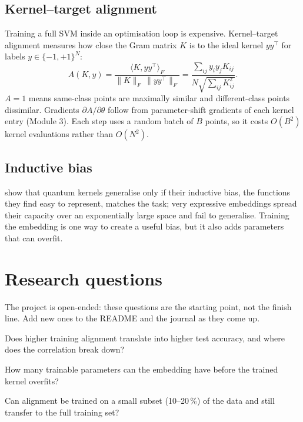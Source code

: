 \documentclass[11pt,a4paper]{article}
\begin{document}
\subsection{Kernel--target alignment}
Training a full SVM inside an optimisation loop is expensive. Kernel--target alignment
\citep{cristianini2001} measures how close the Gram matrix $K$ is to the ideal kernel $yy^\top$ for
labels $y\in\{-1,+1\}^N$:
\begin{equation}
  A(K,y)=\frac{\langle K,yy^\top\rangle_F}{\lVert K\rVert_F\,\lVert yy^\top\rVert_F}
        =\frac{\sum_{ij}y_iy_jK_{ij}}{N\sqrt{\sum_{ij}K_{ij}^2}} .
\end{equation}
$A=1$ means same-class points are maximally similar and different-class points dissimilar.
Gradients $\partial A/\partial\theta$ follow from parameter-shift gradients of each kernel entry
(Module 3). Each step uses a random batch of $B$ points, so it costs $O(B^2)$ kernel evaluations
rather than $O(N^2)$.

\subsection{Inductive bias}
\citet{kubler2021} show that quantum kernels generalise only if their inductive bias, the functions
they find easy to represent, matches the task; very expressive embeddings spread their capacity
over an exponentially large space and fail to generalise. Training the embedding is one way to
create a useful bias, but it also adds parameters that can overfit.

\section{Research questions}
The project is open-ended: these questions are the starting point, not the finish line. Add new
ones to the README and the journal as they come up.

\begin{rqlist}
  \item Does higher training alignment translate into higher test accuracy, and where does the correlation break down?
  \item How many trainable parameters can the embedding have before the trained kernel overfits?
  \item Can alignment be trained on a small subset (10--20\,\%) of the data and still transfer to the full training set?
\end{rqlist}
\end{document}
